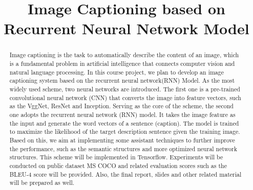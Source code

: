 \documentclass[conference]{IEEEtran}
\begin{document}
\title{Image Captioning based on Recurrent Neural Network Model}

\author{
\and
{}
\and
{}
}

\maketitle

\begin{abstract}
Image captioning is the task to automatically describe the content of an image, which is a fundamental problem in artificial intelligence that connects computer vision and natural language processing. In this course project, we plan to develop an image captioning system based on the recurrent neural network(RNN) Model. As the most widely used scheme, two neural networks are introduced. The first one is a pre-trained convolutional neural network (CNN) that converts the image into feature vectors, such as the VggNet, ResNet and Inception. Serving as the core of the scheme, the second one adopts the recurrent neural network (RNN) model. It takes the image feature as the input and generate the word vectors of a sentence (caption). The model is trained to maximize the likelihood of the target description sentence given the training image. Based on this, we aim at implementing some assistant techniques to further improve the performance, such as the semantic structures and more optimized neural network structures. This scheme will be implemented in Tensorflow. Experiments will be conducted on public dataset MS COCO and related evaluation scores such as the BLEU-4 score will be provided. Also, the final report, slides and other related material will be prepared as well.
\end{abstract}
\end{document}
